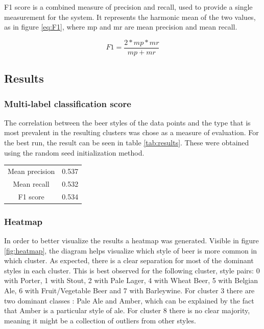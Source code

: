\documentclass[12pt]{article}
\begin{document}
	F1 score is a combined measure of precision and recall, used to provide a single measurement for the system. It represents the harmonic mean of the two values, as in figure \ref{eq:F1}, where mp and mr are mean precision and mean recall.
	
	\begin{equation}
	\label{eq:F1}
	F1 = \frac{2 * mp * mr}{mp + mr}
	\end{equation}
	
	\subsection{Results}
	\subsubsection{Multi-label classification score}
	The correlation between the beer styles of the data points and the type that is most prevalent in the resulting clusters was chose as a measure of evaluation. For the best run, the result can be seen in table \ref{tab:results}. These were obtained using the random seed initialization method.
	
	\begin{center}
		\label{tab:results}
		\begin{tabular}{ |c|c| } 
			\hline
			Mean precision & 0.537 \\
			Mean recall & 0.532 \\
			F1 score & 0.534 \\
			\hline
		\end{tabular}
	\end{center}

	\subsubsection{Heatmap}
	In order to better visualize the results a heatmap was generated. Visible in figure \ref{fig:heatmap}, the diagram helps visualize which style of beer is more common in which cluster. As expected, there is a clear separation for most of the dominant styles in each cluster. This is best observed for the following cluster, style pairs: 0 with Porter, 1 with Stout, 2 with Pale Lager, 4 with Wheat Beer, 5 with Belgian Ale, 6 with Fruit/Vegetable Beer and 7 with Barleywine. For cluster 3 there are two dominant classes : Pale Ale and Amber, which can be explained by the fact that Amber is a particular style of ale. For cluster 8 there is no clear majority, meaning it might be a collection of outliers from other styles.
	
\end{document}
